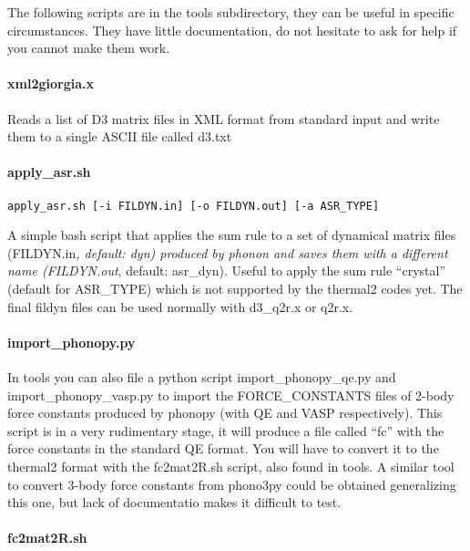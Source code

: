 \documentclass[
]{article}
\begin{document}
The following scripts are in the tools subdirectory, they can be useful
in specific circumstances. They have little documentation, do not
hesitate to ask for help if you cannot make them work.

\hypertarget{xml2giorgia.x}{%
\paragraph{xml2giorgia.x}\label{xml2giorgia.x}}

Reads a list of D3 matrix files in XML format from standard input and
write them to a single ASCII file called d3.txt

\hypertarget{apply_asr.sh}{%
\paragraph{apply\_asr.sh}\label{apply_asr.sh}}

\begin{verbatim}
apply_asr.sh [-i FILDYN.in] [-o FILDYN.out] [-a ASR_TYPE]
\end{verbatim}

A simple bash script that applies the sum rule to a set of dynamical
matrix files (FILDYN.in\emph{, default: dyn) produced by phonon and
saves them with a different name (FILDYN.out}, default: asr\_dyn).
Useful to apply the sum rule \enquote{crystal} (default for ASR\_TYPE)
which is not supported by the thermal2 codes yet. The final fildyn files
can be used normally with d3\_q2r.x or q2r.x.

\hypertarget{import_phonopy.py}{%
\paragraph{import\_phonopy.py}\label{import_phonopy.py}}

In tools you can also file a python script import\_phonopy\_qe.py and
import\_phonopy\_vasp.py to import the FORCE\_CONSTANTS files of 2-body
force constants produced by phonopy (with QE and VASP respectively).
This script is in a very rudimentary stage, it will produce a file
called \enquote{fc} with the force constants in the standard QE format.
You will have to convert it to the thermal2 format with the fc2mat2R.sh
script, also found in tools. A similar tool to convert 3-body force
constants from phono3py could be obtained generalizing this one, but
lack of documentatio makes it difficult to test.

\hypertarget{fc2mat2r.sh}{%
\paragraph{fc2mat2R.sh}\label{fc2mat2r.sh}}
\end{document}
